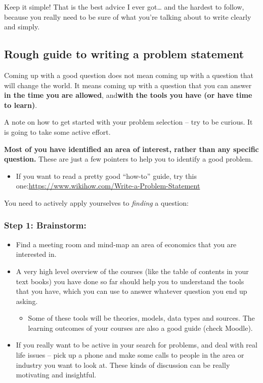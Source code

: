 \documentclass[10pt,twoside]{article}
\providecommand{\tightlist}{%
  \setlength{\itemsep}{0pt}\setlength{\parskip}{0pt}}
\begin{document}
Keep it simple! That is the best advice I ever got\ldots{} and the
hardest to follow, because you really need to be sure of what you're
talking about to write clearly and simply.

\hypertarget{rough-guide-to-writing-a-problem-statement}{%
\subsection{Rough guide to writing a problem
statement}\label{rough-guide-to-writing-a-problem-statement}}

Coming up with a good question does not mean coming up with a question
that will change the world. It means coming up with a question that you
can answer \textbf{in the time you are allowed}, and\textbf{with the
tools you have (or have time to learn)}.

A note on how to get started with your problem selection -- try to be
curious. It is going to take some active effort.

\textbf{Most of you have identified an area of interest, rather than any
specific question.} These are just a few pointers to help you to
identify a good problem.

\begin{itemize}
\tightlist
\item
  If you want to read a pretty good ``how-to'' guide, try this
  one:\href{https://www.wikihow.com/Write-a-Problem-Statement}{{https://www.wikihow.com/Write-a-Problem-Statement}}
\end{itemize}

You need to actively apply yourselves to \emph{finding} a question:

\hypertarget{step-1-brainstorm}{%
\subsubsection{Step 1: Brainstorm:}\label{step-1-brainstorm}}

\begin{itemize}
\item
  Find a meeting room and mind-map an area of economics that you are
  interested in.
\item
  A very high level overview of the courses (like the table of contents
  in your text books) you have done so far should help you to understand
  the tools that you have, which you can use to answer whatever question
  you end up asking.

  \begin{itemize}
  \tightlist
  \item
    Some of these tools will be theories, models, data types and
    sources. The learning outcomes of your courses are also a good guide
    (check Moodle).
  \end{itemize}
\item
  If you really want to be active in your search for problems, and deal
  with real life issues -- pick up a phone and make some calls to people
  in the area or industry you want to look at. These kinds of discussion
  can be really motivating and insightful.
\end{itemize}
\end{document}
